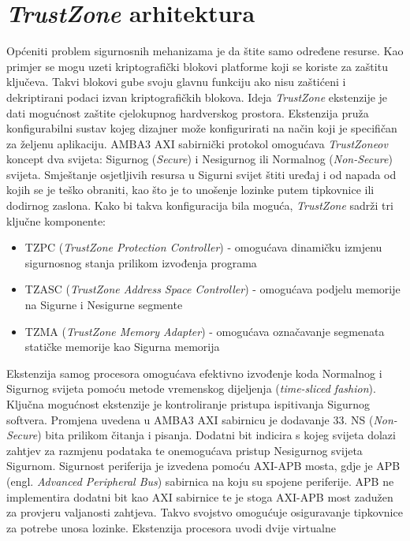 \documentclass[times, utf8, diplomski, numeric]{fer}
\begin{document}
\section{\textit{TrustZone} arhitektura}
Općeniti problem sigurnosnih mehanizama je da štite samo određene resurse. Kao primjer se mogu uzeti kriptografički blokovi
platforme koji se koriste za zaštitu ključeva. Takvi blokovi gube svoju glavnu funkciju ako nisu zaštićeni i dekriptirani
podaci izvan kriptografičkih blokova. Ideja \textit{TrustZone} ekstenzije je dati mogućnost zaštite cjelokupnog hardverskog
prostora. Ekstenzija pruža konfigurabilni sustav kojeg dizajner može konfigurirati na način koji je specifičan za željenu
aplikaciju. AMBA3 AXI sabirnički protokol omogućava \textit{TrustZoneov} koncept dva svijeta: Sigurnog (\textit{Secure}) i
Nesigurnog ili Normalnog (\textit{Non-Secure}) svijeta. Smještanje osjetljivih resursa u Sigurni svijet štiti uređaj i od napada
od kojih se je teško obraniti, kao što je to unošenje lozinke putem tipkovnice ili dodirnog zaslona.
Kako bi takva konfiguracija bila moguća, \textit{TrustZone} sadrži tri ključne komponente:
\begin{itemize}
  \item{TZPC (\textit{TrustZone Protection Controller}) - omogućava dinamičku izmjenu sigurnosnog stanja prilikom izvođenja
  programa}
  \item{TZASC (\textit{TrustZone Address Space Controller}) - omogućava podjelu memorije na Sigurne i Nesigurne segmente}
  \item{TZMA (\textit{TrustZone Memory Adapter}) - omogućava označavanje segmenata statičke memorije kao Sigurna memorija}
\end{itemize}
Ekstenzija samog procesora
omogućava efektivno izvođenje koda Normalnog i Sigurnog svijeta pomoću metode vremenskog dijeljenja (\textit{time-sliced
fashion}). Ključna mogućnost ekstenzije je kontroliranje pristupa ispitivanja Sigurnog softvera. Promjena uvedena u AMBA3
AXI sabirnicu je dodavanje 33. NS (\textit{Non-Secure}) bita prilikom čitanja i pisanja. Dodatni bit indicira s kojeg
svijeta dolazi zahtjev za razmjenu podataka te onemogućava pristup Nesigurnog svijeta Sigurnom. Sigurnost periferija je
izvedena pomoću AXI-APB mosta, gdje je APB (engl. \textit{Advanced Peripheral Bus}) sabirnica na koju su spojene
periferije. APB ne implementira dodatni bit kao AXI sabirnice te je stoga AXI-APB most zadužen za provjeru valjanosti
zahtjeva. Takvo svojstvo omogućuje osiguravanje tipkovnice za potrebe unosa lozinke. Ekstenzija procesora uvodi dvije virtualne
\end{document}
